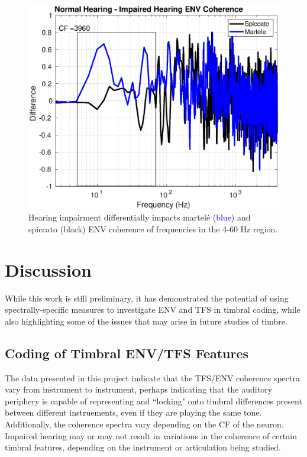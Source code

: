 \documentclass[conference]{IEEEtran}
\begin{document}
\begin{figure}[h]
\includegraphics[width = .5\textwidth]{martele_spiccato_ENV_3960}
\caption{Hearing impairment differentially impacts martel\'{e} (\textcolor{blue}{blue}) and spiccato (black) ENV coherence of frequencies in the 4-60 Hz region.}
\label{spic_mart_diff}
\end{figure} 

\section{Discussion}
While this work is still preliminary, it has demonstrated the potential of using spectrally-specific measures to investigate ENV and TFS in timbral coding, while also highlighting some of the issues that may arise in future studies of timbre. 

\subsection{Coding of Timbral ENV/TFS Features} 

The data presented in this project indicate that the TFS/ENV coherence spectra vary from instrument to instrument, perhaps indicating that the auditory periphery is capable of representing and ``locking" onto timbral differences present between different instruements, even if they are playing the same tone. Additionally, the coherence spectra vary depending on the CF of the neuron. Impaired hearing may or may not result in variations in the coherence of certain timbral features, depending on the instrument or articulation being studied. 
  
\end{document}
